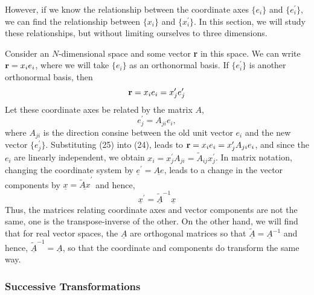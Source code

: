 However, if we know the relationship between the coordinate axes 
$\{e_i\}$ and $\{e^{\prime}_i\}$, we can find the relationship 
between $\{x_i\}$ and $\{x^{\prime}_i\}$.  In this section, we will 
study these relationships, but without limiting ourselves to three 
dimensions.

Consider an $N$-dimensional space and some vector {\bf r} in this 
space.  We can write ${\bf r} = x_ie_i$, where we will take $\{e_i\}$ 
as an orthonormal basis.  If $\{e^{\prime}_i\}$ is another 
orthonormal basis, then
\begin{equation}
{\bf r} = x_i e_i = x^{\prime}_j e^{\prime}_j
\label{chap16app-eqno24}
\end{equation}
Let these coordinate axes be related by the matrix $A$,
\begin{equation}
e^{\prime}_j = A_{ji} e_i ,
\label{chap16app-eqno25}
\end{equation}
where $A_{ji}$ is the direction consine between the old unit vector 
$e_i$ and the new vector $\{e^{\prime}_j\}$.  Substituting (25) into 
(24), leads to ${\bf r} = x_i e_i = x^{\prime}_j A_{ji} e_i$, and since 
the $e_i$ are linearly independent, we obtain $x_i = x^{\prime}_j 
A_{ji} = {\tilde{A}}_{ij} x^{\prime}_j$.  In matrix notation, 
changing the coordinate system by $\underline{e}^{\prime} = 
\underline{Ae}$, leads to a change in the vector components by 
$\underline{x} = \underline{\tilde{A}x}^{\prime}$ and hence,
\begin{equation}
\underline{x}^{\prime} = \underline{\tilde{A}}^{-1} \underline{x}
\label{chap16app-eqno26}
\end{equation}
Thus, the matrices relating coordinate axes and vector components are 
not the same, one is the transpose-inverse of the other.  On the other 
hand, we will find that for real vector spaces, the $\underline{A}$ are 
orthogonal matrices so that $\underline{\tilde{A}} = 
\underline{A}^{-1}$ and hence, $\underline{\tilde{A}}^{-1} = 
\underline{A}$, so that the coordinate and components do transform 
the same way.

\subsubsection{Successive Transformations}


